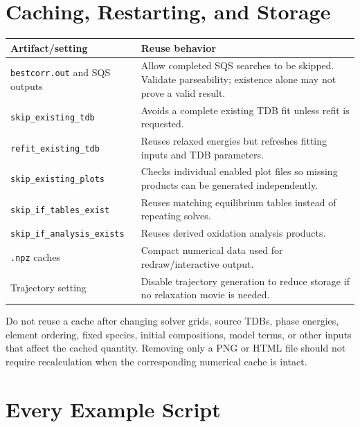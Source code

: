 \documentclass[11pt,letterpaper]{article}
\newcommand{\file}[1]{\nolinkurl{#1}}
\newcommand{\setting}[1]{\nolinkurl{#1}}
\begin{document}
\section{Caching, Restarting, and Storage}

\begin{longtable}{p{}p{}}
\toprule
Artifact/setting & Reuse behavior \\
\midrule
\endhead
\file{bestcorr.out} and SQS outputs & Allow completed SQS searches to be skipped. Validate parseability; existence alone may not prove a valid result. \\
\setting{skip_existing_tdb} & Avoids a complete existing TDB fit unless refit is requested. \\
\setting{refit_existing_tdb} & Reuses relaxed energies but refreshes fitting inputs and TDB parameters. \\
\setting{skip_existing_plots} & Checks individual enabled plot files so missing products can be generated independently. \\
\setting{skip_if_tables_exist} & Reuses matching equilibrium tables instead of repeating solves. \\
\setting{skip_if_analysis_exists} & Reuses derived oxidation analysis products. \\
\file{.npz} caches & Compact numerical data used for redraw/interactive output. \\
Trajectory setting & Disable trajectory generation to reduce storage if no relaxation movie is needed. \\
\bottomrule
\end{longtable}

Do not reuse a cache after changing solver grids, source TDBs, phase energies,
element ordering, fixed species, initial compositions, model terms, or other
inputs that affect the cached quantity. Removing only a PNG or HTML file
should not require recalculation when the corresponding numerical cache is
intact.

\section{Every Example Script}
\end{document}
